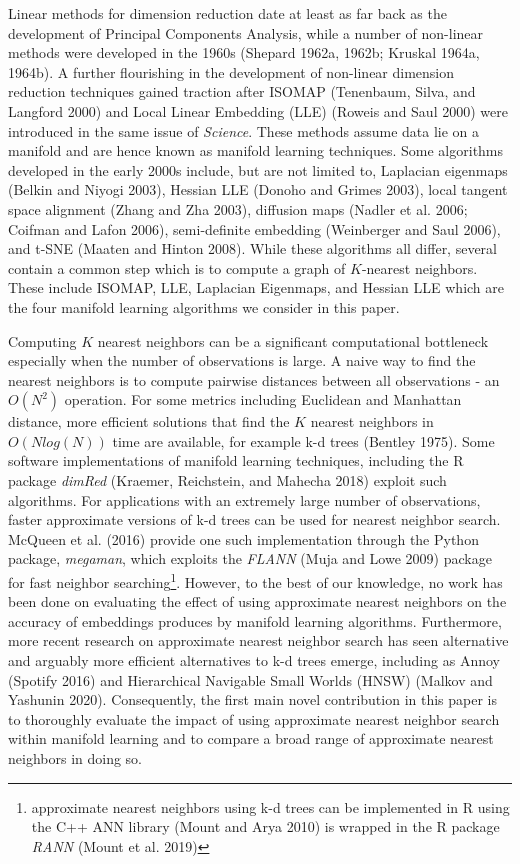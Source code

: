 \documentclass[12pt]{article}
\begin{document}
Linear methods for dimension reduction date at least as far back as the development of Principal Components Analysis, while a number of non-linear methods were developed in the 1960s (Shepard 1962a, 1962b; Kruskal 1964a, 1964b). A further flourishing in the development of non-linear dimension reduction techniques gained traction after ISOMAP (Tenenbaum, Silva, and Langford 2000) and Local Linear Embedding (LLE) (Roweis and Saul 2000) were introduced in the same issue of \emph{Science}. These methods assume data lie on a manifold and are hence known as manifold learning techniques. Some algorithms developed in the early 2000s include, but are not limited to, Laplacian eigenmaps (Belkin and Niyogi 2003), Hessian LLE (Donoho and Grimes 2003), local tangent space alignment (Zhang and Zha 2003), diffusion maps (Nadler et al. 2006; Coifman and Lafon 2006), semi-definite embedding (Weinberger and Saul 2006), and t-SNE (Maaten and Hinton 2008). While these algorithms all differ, several contain a common step which is to compute a graph of \(K\)-nearest neighbors. These include ISOMAP, LLE, Laplacian Eigenmaps, and Hessian LLE which are the four manifold learning algorithms we consider in this paper.

Computing \(K\) nearest neighbors can be a significant computational bottleneck especially when the number of observations is large. A naive way to find the nearest neighbors is to compute pairwise distances between all observations - an \(O(N^2)\) operation. For some metrics including Euclidean and Manhattan distance, more efficient solutions that find the \(K\) nearest neighbors in \(O(Nlog(N))\) time are available, for example k-d trees (Bentley 1975). Some software implementations of manifold learning techniques, including the R package \emph{dimRed} (Kraemer, Reichstein, and Mahecha 2018) exploit such algorithms. For applications with an extremely large number of observations, faster approximate versions of k-d trees can be used for nearest neighbor search. McQueen et al. (2016) provide one such implementation through the Python package, \emph{megaman}, which exploits the \emph{FLANN} (Muja and Lowe 2009) package for fast neighbor searching\footnote{approximate nearest neighbors using k-d trees can be implemented in R using the C++ ANN library (Mount and Arya 2010) is wrapped in the R package \emph{RANN} (Mount et al. 2019)}. However, to the best of our knowledge, no work has been done on evaluating the effect of using approximate nearest neighbors on the accuracy of embeddings produces by manifold learning algorithms. Furthermore, more recent research on approximate nearest neighbor search has seen alternative and arguably more efficient alternatives to k-d trees emerge, including as Annoy (Spotify 2016) and Hierarchical Navigable Small Worlds (HNSW) (Malkov and Yashunin 2020). Consequently, the first main novel contribution in this paper is to thoroughly evaluate the impact of using approximate nearest neighbor search within manifold learning and to compare a broad range of approximate nearest neighbors in doing so.
\end{document}
